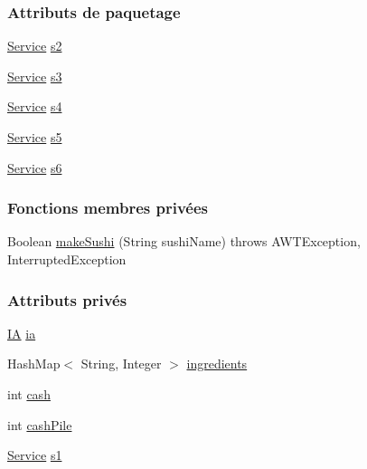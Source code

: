 \subsubsection*{Attributs de paquetage}
\begin{DoxyCompactItemize}
\item 
\hyperlink{classmain_1_1Service}{Service} \hyperlink{classmain_1_1Manager_adb7111921777e8df2511b73b69c7af05}{s2}
\item 
\hyperlink{classmain_1_1Service}{Service} \hyperlink{classmain_1_1Manager_a853a3f26b9a69b2dc7f96055a832ddbd}{s3}
\item 
\hyperlink{classmain_1_1Service}{Service} \hyperlink{classmain_1_1Manager_a9735c9ed38407fa5cc20623372807a01}{s4}
\item 
\hyperlink{classmain_1_1Service}{Service} \hyperlink{classmain_1_1Manager_abc0528186764144b702030cdbcb409df}{s5}
\item 
\hyperlink{classmain_1_1Service}{Service} \hyperlink{classmain_1_1Manager_a32e046e37c048665d90d769f3e0b0bac}{s6}
\end{DoxyCompactItemize}
\subsubsection*{Fonctions membres privées}
\begin{DoxyCompactItemize}
\item 
Boolean \hyperlink{classmain_1_1Manager_a4088d1c9a36a219349959e4ab7184eb9}{make\+Sushi} (String sushi\+Name)  throws A\+W\+T\+Exception, 			\+Interrupted\+Exception 
\end{DoxyCompactItemize}
\subsubsection*{Attributs privés}
\begin{DoxyCompactItemize}
\item 
\hyperlink{classmain_1_1IA}{I\+A} \hyperlink{classmain_1_1Manager_a2ec66c16cb2670f76ad9f7d941761221}{ia}
\item 
Hash\+Map$<$ String, Integer $>$ \hyperlink{classmain_1_1Manager_a20b4db237b6744ed2b6974af96acacff}{ingredients}
\item 
int \hyperlink{classmain_1_1Manager_a1d8a267adacd2d29d6d1954e59b56948}{cash}
\item 
int \hyperlink{classmain_1_1Manager_aba1943680dbaf8eba8576dc54d56bda8}{cash\+Pile}
\item 
\hyperlink{classmain_1_1Service}{Service} \hyperlink{classmain_1_1Manager_a6d675483c641fbd495900af6a2d48868}{s1}
\end{DoxyCompactItemize}
